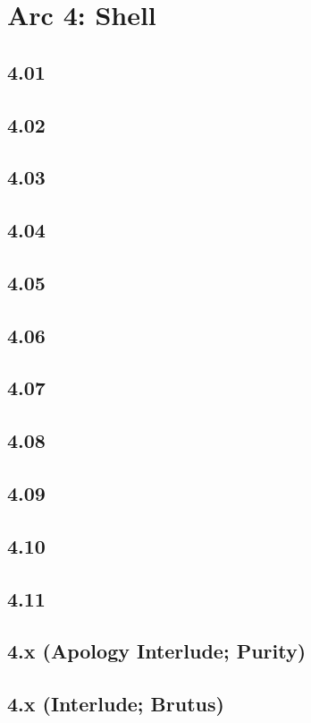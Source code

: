 \part*{Arc 4: Shell}
 \chapter*{4.01}
 \chapter*{4.02}
 \chapter*{4.03}
 \chapter*{4.04}
 \chapter*{4.05}
 \chapter*{4.06}
 \chapter*{4.07}
 \chapter*{4.08}
 \chapter*{4.09}
 \chapter*{4.10}
 \chapter*{4.11}
 \chapter*{4.x (Apology Interlude; Purity)}
 \chapter*{4.x (Interlude; Brutus)}














